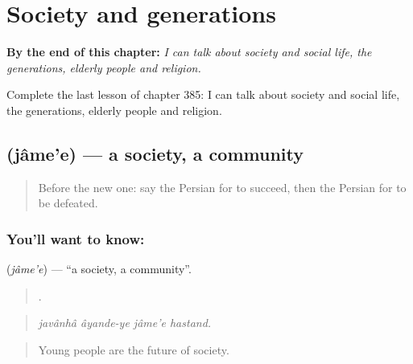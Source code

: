 
\chapter{Society and generations}
\label{ch:fa-society-and-generations}

\begin{chapteropening}
\textbf{By the end of this chapter:} \emph{I can talk about society and social life, the generations, elderly people and religion.}

Complete the last lesson of chapter 385: I can talk about society and social life, the generations, elderly people and religion.
\end{chapteropening}

\section[\texorpdfstring{\fa{جامعه} (jâme'e)}{جامعه (jâme'e)}]{ (jâme'e) — a society, a community}

\label{lesson:FA-C385-jamee}



\begin{quote}
Before the new one: say the Persian for to succeed, then the Persian for to be defeated.
\end{quote}

\subsection*{You'll want to know: }
\textbf{} (\emph{jâme'e}) — \textquotedblleft{}a society, a community\textquotedblright{}.

\begin{quote}
   .
\end{quote}

\begin{quote}
\emph{javânhâ âyande-ye jâme'e hastand.}
\end{quote}

\begin{quote}
Young people are the future of society.
\end{quote}

